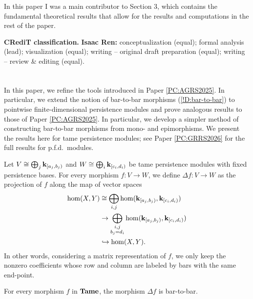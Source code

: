 In this paper I was a main contributor to Section 3, which contains the fundamental theoretical results that allow for the results and computations in the rest of the paper.

\textbf{\sffamily CRediT classification.} \textbf{Isaac Ren:} conceptualization (equal); formal analysis (lead); visualization (equal); writing -- original draft preparation (equal); writing -- review \& editing (equal).

\section[Barcode matchings and \texorpdfstring{$p$}{p}-norms]{}

In this paper, we refine the tools introduced in Paper \ref{PC:AGRS2025}. In particular, we extend the notion of bar-to-bar morphisms (\cref{!D:bar-to-bar}) to pointwise finite-dimensional persistence modules and prove analogous results to those of Paper \ref{PC:AGRS2025}. In particular, we develop a simpler method of constructing bar-to-bar morphisms from mono- and epimorphisms. We present the results here for tame persistence modules; see Paper \ref{PC:GRRS2026} for the full results for p.f.d.\ modules.

\begin{definition}
  Let $V \cong \bigoplus_j \mathbf{k}_{[a_j, b_j)}$ and $W \cong \bigoplus_i \mathbf{k}_{[c_i, d_i)}$ be tame persistence modules with fixed persistence bases. For every morphism $f \colon V \to W$, we define $\Delta f \colon V \to W$ as the projection of $f$ along the map of vector spaces
  \begin{align*}
    \hom(X, Y) & \cong \bigoplus_{i, j} \hom(\mathbf{k}_{[a_j, b_j)}, \mathbf{k}_{[c_i, d_i)}) \\
    & \to \bigoplus_{\substack{i, j \\ b_j = d_i}} \hom(\mathbf{k}_{[a_j, b_j)}, \mathbf{k}_{[c_i, d_i)}) \\
    & \hookrightarrow \hom(X, Y).
  \end{align*}
  In other words, considering a matrix representation of $f$, we only keep the nonzero coefficients whose row and column are labeled by bars with the same end-point.
\end{definition}

\begin{theorem}
  For every morphism $f$ in $\operatorname{\mathbf{Tame}}$, the morphism $\Delta f$ is bar-to-bar.
\end{theorem}

